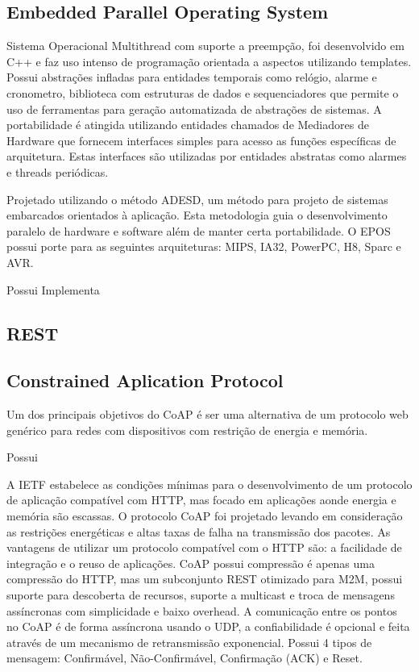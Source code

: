\subsection{Embedded Parallel Operating System}
Sistema Operacional Multithread com suporte a preempção, foi desenvolvido em C++ e faz uso intenso de programação orientada a aspectos utilizando templates.
Possui abstrações infladas para entidades temporais como relógio, alarme e cronometro, biblioteca com estruturas de dados e sequenciadores que permite o uso de ferramentas para geração automatizada de abstrações de sistemas. A portabilidade é atingida utilizando entidades chamados de Mediadores de Hardware que fornecem interfaces simples para acesso as funções específicas de arquitetura. Estas interfaces são utilizadas por entidades abstratas como alarmes e threads periódicas.

Projetado utilizando o método ADESD, um método para projeto de sistemas embarcados orientados à aplicação. Esta metodologia guia o desenvolvimento paralelo de hardware e software além de manter certa portabilidade. O EPOS possui porte para as seguintes arquiteturas: MIPS, IA32, PowerPC, H8, Sparc e AVR.

Possui Implementa


\cite{epos}


\subsection{REST}

\subsection{Constrained Aplication Protocol}

Um dos principais objetivos do CoAP é ser uma alternativa de um protocolo web genérico para redes com dispositivos com restrição de energia e memória.

Possui 

A IETF estabelece as condições mínimas para o desenvolvimento de um protocolo de aplicação compatível com HTTP, mas focado em aplicações aonde energia e memória são escassas. O protocolo CoAP foi projetado levando em consideração as restrições energéticas e altas taxas de falha na transmissão dos pacotes. As vantagens de utilizar um protocolo compatível com o HTTP são: a facilidade de integração e o reuso de aplicações. CoAP possui compressão é apenas uma compressão do HTTP, mas um subconjunto REST otimizado para M2M, possui suporte para descoberta de recursos, suporte a multicast e troca de mensagens assíncronas com simplicidade e baixo overhead. A comunicação entre os pontos no CoAP é de forma assíncrona usando o UDP, a confiabilidade é opcional e feita através de um mecanismo de retransmissão exponencial. Possui 4 tipos de mensagem: Confirmável, Não-Confirmável, Confirmação (ACK) e Reset.


